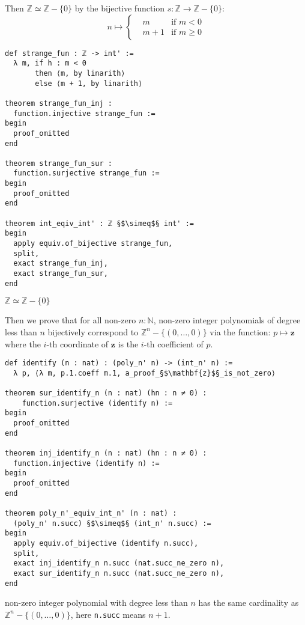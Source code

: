 \documentclass{report}
\theoremstyle{definition}
\theoremstyle{plain}
\newenvironment{code}{\captionsetup{type=listing}}{}
\begin{document}
Then $\mathbb Z\simeq \mathbb Z-\{0\}$ by the bijective function $s:\mathbb Z\to \mathbb Z-\{0\}$:
\begin{equation*}
n\mapsto\left\{
\begin{aligned}
& m & \text{if }m < 0\\
& m + 1 & \text{if }m \ge 0
\end{aligned}
\right.
\end{equation*}
\begin{code}
\begin{verbatim}
def strange_fun : ℤ -> int' := 
  λ m, if h : m < 0 
       then ⟨m, by linarith⟩ 
       else ⟨m + 1, by linarith⟩

theorem strange_fun_inj : 
  function.injective strange_fun :=
begin
  proof_omitted
end

theorem strange_fun_sur : 
  function.surjective strange_fun :=
begin
  proof_omitted
end

theorem int_eqiv_int' : ℤ §$\simeq$§ int' :=
begin
  apply equiv.of_bijective strange_fun,
  split,
  exact strange_fun_inj,
  exact strange_fun_sur,
end
\end{verbatim}
\caption{$\mathbb Z\simeq \mathbb Z-\{0\}$}
\end{code}

Then we prove that for all non-zero $n:\mathbb N$, non-zero integer polynomials of degree less than $n$ bijectively correspond to $\mathbb Z^n-\{(0,\dots,0)\}$ via the function:
$p\mapsto \mathbf{z}$ where the $i$-th coordinate of $\mathbf{z}$ is the $i$-th coefficient of $p$.
\begin{code}
\begin{verbatim}
def identify (n : nat) : (poly_n' n) -> (int_n' n) := 
  λ p, ⟨λ m, p.1.coeff m.1, a_proof_§$\mathbf{z}$§_is_not_zero⟩

theorem sur_identify_n (n : nat) (hn : n ≠ 0) : 
    function.surjective (identify n) :=
begin
  proof_omitted
end

theorem inj_identify_n (n : nat) (hn : n ≠ 0) : 
  function.injective (identify n) :=
begin
  proof_omitted
end

theorem poly_n'_equiv_int_n' (n : nat) : 
  (poly_n' n.succ) §$\simeq$§ (int_n' n.succ) :=
begin
  apply equiv.of_bijective (identify n.succ),
  split,
  exact inj_identify_n n.succ (nat.succ_ne_zero n),
  exact sur_identify_n n.succ (nat.succ_ne_zero n),
end
\end{verbatim}
\caption{non-zero integer polynomial with degree less than $n$ has the same cardinality as $\mathbb Z^n-\{(0,\dots,0)\}$, here {\tt n.succ} means $n+1$.}
\end{code}
\end{document}
